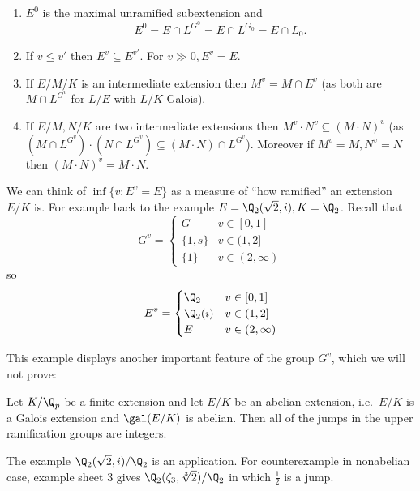 \documentclass[a4paper]{article}
\begin{document}
\begin{proposition}\leavevmode
  \begin{enumerate}
  \item \(E^0\) is the maximal unramified subextension and
    \[
      E^0 = E \cap L^{G^0} = E \cap L^{G_0} = E \cap L_0.
    \]
  \item If \(v \leq v'\) then \(E^v \subseteq E^{v'}\). For \(v \gg 0, E^v = E\).
  \item If \(E/M/K\) is an intermediate extension then \(M^v = M \cap E^v\) (as both are \(M \cap L^{G^v}\) for \(L/E\) with \(L/K\) Galois).
  \item If \(E/M, N/K\) are two intermediate extensions then \(M^v \cdot N^v \subseteq (M\cdot N)^v\) (as \((M \cap L^{G^v}) \cdot (N \cap L^{G^v}) \subseteq (M \cdot N) \cap L^{G^v}\)). Moreover if \(M^v = M, N^v = N\) then \((M \cdot N)^v = M \cdot N\).
  \end{enumerate}
\end{proposition}

We can think of \(\inf\{v: E^v = E\}\) as a measure of ``how ramified'' an extension \(E/K\) is. For example back to the example \(E = \Q_2(\sqrt 2, i), K = \Q_2\). Recall that
\[
  G^v =
  \begin{cases}
    G & v \in [0, 1] \\
    \{1, s\} & v \in (1, 2] \\
    \{1\} & v \in (2, \infty)
  \end{cases}
\]
so
\[
  E^v =
  \begin{cases}
    \Q_2 & v \in [0, 1] \\
    \Q_2(i) & v \in (1, 2] \\
    E & v \in (2, \infty)
  \end{cases}
\]

This example displays another important feature of the group \(G^v\), which we will not prove:

\begin{theorem}
  Let \(K/\Q_p\) be a finite extension and let \(E/K\) be an abelian extension, i.e.\ \(E/K\) is a Galois extension and \(\gal(E/K)\) is abelian. Then all of the jumps in the upper ramification groups are integers.
\end{theorem}

The example \(\Q_2(\sqrt 2, i)/\Q_2\) is an application. For counterexample in nonabelian case, example sheet 3 gives \(\Q_2(\zeta_3, \sqrt[3]{2})/\Q_2\) in which \(\frac{1}{2}\) is a jump.
\end{document}
